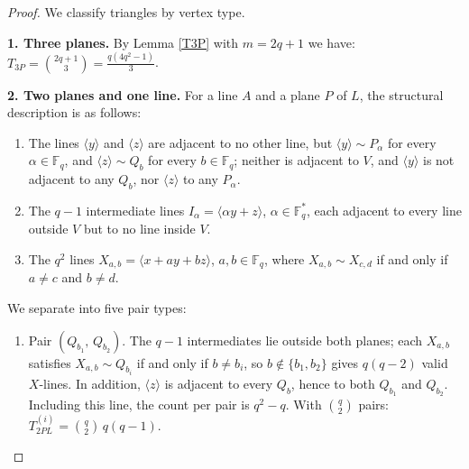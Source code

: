 \documentclass[11pt]{amsart}
\theoremstyle{plain}
\begin{document}
\begin{proof}
We classify triangles by vertex type.

\medskip
\noindent\textbf{1. Three planes.} By Lemma \ref{T3P} with $m=2q+1$ we have: $T_{3P}= \binom{2q+1}{3} =\frac{q(4q^2-1)}{3}$.

\smallskip
\noindent\textbf{2. Two planes and one line.}
For a line $A$ and a plane $P$ of $L$,  the structural description is as follows:

\begin{enumerate}
\item[(1)] The lines $\langle y \rangle$ and $\langle z \rangle$ are adjacent
to no other line, but $\langle y \rangle \sim P_\alpha$ for every
$\alpha \in \mathbb F_q$, and $\langle z \rangle \sim Q_b$ for every
$b \in \mathbb F_q$; neither is adjacent to $V$, and $\langle y \rangle$ is
not adjacent to any $Q_b$, nor $\langle z \rangle$ to any $P_\alpha$.
\item[(2)] The $q-1$ intermediate lines $I_\alpha = \langle \alpha y + z
\rangle$, $\alpha \in \mathbb F_q^*$, each adjacent to every line outside
$V$ but to no line inside $V$.
\item[(3)] The $q^2$ lines $X_{a,b} = \langle x + ay + bz \rangle$,
$a,b \in \mathbb F_q$, where $X_{a,b} \sim X_{c,d}$ if and only if $a \neq c$
and $b \neq d$.
\end{enumerate}

We separate into five pair types:
\begin{enumerate}
\item[(i)] Pair $(Q_{b_1},\,Q_{b_2})$. The $q-1$ intermediates lie outside both planes; each $X_{a,b}$ satisfies $X_{a,b}\sim Q_{b_i}$ if and only if $b\neq b_i$, so
$b\notin\{b_1,b_2\}$ gives $q(q-2)$ valid $X$-lines.  In addition, $\langle z \rangle$ is adjacent to
every $Q_b$, hence to both $Q_{b_1}$ and $Q_{b_2}$. Including this line, the count per pair is $q^2-q$. With
$\binom{q}{2}$ pairs: $T_{2PL}^{(i)} = \binom{q}{2}\,q(q-1)$.



\end{enumerate}
\end{proof}
\end{document}
